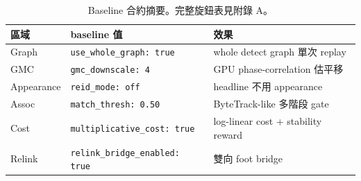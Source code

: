 \begin{table}[h]\small\setlength{\tabcolsep}{4pt}
\begin{tabularx}{\linewidth}{@{}l
  >{\raggedright\arraybackslash}p{4.8cm}
  >{\raggedright\arraybackslash}X@{}}
\toprule
區域 & baseline 值 & 效果 \\
\midrule
Graph     & \texttt{use\_whole\_graph: true}      & whole detect graph 單次 replay \\
GMC       & \texttt{gmc\_downscale: 4}            & GPU phase-correlation 估平移 \\
Appearance& \texttt{reid\_mode: off}              & headline 不用 appearance \\
Assoc     & \texttt{match\_thresh: 0.50}          & ByteTrack-like 多階段 gate \\
Cost      & \texttt{multiplicative\_cost: true}   & log-linear cost + stability reward \\
Relink    & \texttt{relink\_bridge\_enabled: true}& 雙向 foot bridge \\
\bottomrule
\end{tabularx}
\caption{Baseline 合約摘要。完整旋鈕表見附錄 A。}\label{tab:baseline}
\end{table}

